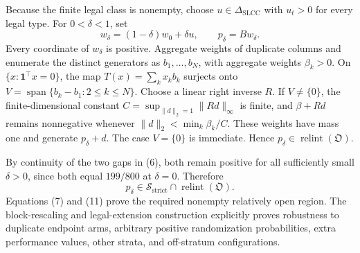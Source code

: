 Because the finite legal class is nonempty, choose \(u\in\Delta_{\mathrm{SLCC}}\) with \(u_t>0\) for every legal type.  For \(0<\delta<1\), set
\[
w_\delta=(1-\delta)w_0+\delta u,
\qquad
p_\delta=Bw_\delta.
\tag{10}
\]
Every coordinate of \(w_\delta\) is positive.  Aggregate weights of duplicate columns and enumerate the distinct generators as \(b_1,\ldots,b_N\), with aggregate weights \(\beta_k>0\).  On \(\{x:\mathbf 1^{\top}x=0\}\), the map \(T(x)=\sum_kx_kb_k\) surjects onto \(V=\operatorname{span}\{b_k-b_1:2\leq k\leq N\}\).  Choose a linear right inverse \(R\).  If \(V\neq\{0\}\), the finite-dimensional constant \(C=\sup_{\|d\|_2=1}\|Rd\|_\infty\) is finite, and \(\beta+Rd\) remains nonnegative whenever \(\|d\|_2<\min_k\beta_k/C\).  These weights have mass one and generate \(p_\delta+d\).  The case \(V=\{0\}\) is immediate.  Hence \(p_\delta\in\operatorname{relint}(\mathfrak O)\).

By continuity of the two gaps in (6), both remain positive for all sufficiently small \(\delta>0\), since both equal \(199/800\) at \(\delta=0\).  Therefore
\[
p_\delta\in\mathcal S_{\mathrm{strict}}\cap\operatorname{relint}(\mathfrak O).
\tag{11}
\]
Equations (7) and (11) prove the required nonempty relatively open region.  The block-rescaling and legal-extension construction explicitly proves robustness to duplicate endpoint arms, arbitrary positive randomization probabilities, extra performance values, other strata, and off-stratum configurations.